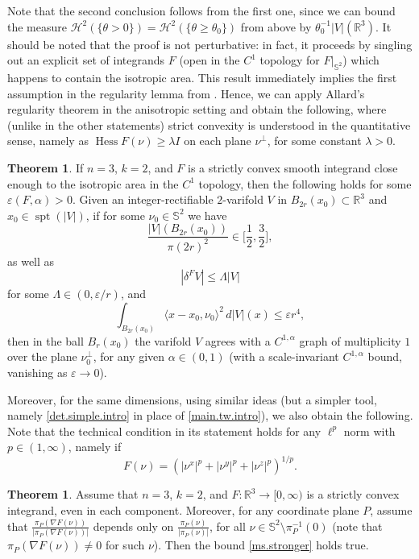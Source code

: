 \documentclass[11pt,a4paper]{amsart}
\newcommand{\R}{\mathbb{R}}
\newcommand{\ang}[1]{\langle#1\rangle}
\theoremstyle{definition}
\newtheorem{thm}[definition]{Theorem}
\renewcommand{\epsilon}{\varepsilon}
\begin{document}
Note that the second conclusion follows from the first one, since we can bound the measure $\mathcal{H}^2(\{\theta>0\})=\mathcal{H}^2(\{\theta\ge\theta_0\})$ from above by $\theta_0^{-1}|V|(\R^3)$.
It should be noted that the proof is not perturbative: in fact, it proceeds by
singling out an explicit set of integrands $F$ (open in the $C^1$ topology for $F|_{\mathbb{S}^{2}}$)
which happens to contain the isotropic area. %
This result %
immediately implies the first assumption in the regularity lemma from \cite[p.\ 25]{All.const}.
Hence, we can apply Allard's regularity theorem in the anisotropic setting \cite[p.\ 27]{All.const}
and obtain the following, where (unlike in the other statements) strict convexity is understood in the quantitative sense, namely as
$\operatorname{Hess}F(\nu)\ge\lambda I$ on each plane $\nu^\perp$, for some constant $\lambda>0$.

\begin{thm}
    If $n=3$, $k=2$, and $F$ is a strictly convex smooth integrand close enough to the isotropic area in the $C^1$ topology,
    then the following holds for some $\epsilon(F,\alpha)>0$. Given an integer-rectifiable $2$-varifold $V$ in $B_{2r}(x_0)\subset\R^3$ %
    and $x_0\in\operatorname{spt}(|V|)$,
    if for some $\nu_0\in\mathbb{S}^2$ we have
    $$\frac{|V|(B_{2r}(x_0))}{\pi(2r)^2}\in\Big[\frac12,\frac32\Big],$$
    as well as
    $$|\delta^FV|\le\Lambda|V|$$
    for some $\Lambda\in(0,\varepsilon/r)$, and
    $$\int_{B_{2r}(x_0)}\ang{x-x_0,\nu_0}^2\,d|V|(x)\le\epsilon r^4,$$
    then in the ball $B_r(x_0)$ the varifold $V$ agrees with a $C^{1,\alpha}$ graph of multiplicity $1$
    over the plane $\nu_0^\perp$,
    for any given $\alpha\in(0,1)$ (with a scale-invariant $C^{1,\alpha}$ bound, vanishing as $\epsilon\to0$).
\end{thm}

Moreover, for the same dimensions, using similar ideas (but a simpler tool, namely \cref{det.simple.intro}
in place of \cref{main.tw.intro}), we also obtain the following. Note that
the technical condition in its statement holds for any $\ell^p$ norm with $p\in(1,\infty)$,
namely if
$$F(\nu)=(|\nu^x|^p+|\nu^y|^p+|\nu^z|^p)^{1/p}.$$

\begin{thm}\label{main.tris}
    Assume that $n=3$, $k=2$, and $F:\R^3\to[0,\infty)$ is a strictly convex integrand, even in each component.
    Moreover, for any coordinate plane $P$, assume that
    $\frac{\pi_P(\nabla F(\nu))}{|\pi_P(\nabla F(\nu))|}$ depends only on $\frac{\pi_P(\nu)}{|\pi_P(\nu)|}$,
    for all $\nu\in\mathbb{S}^2\setminus\pi_P^{-1}(0)$ (note that
    $\pi_P(\nabla F(\nu))\neq0$ for such $\nu$).
    Then the bound \cref{ms.stronger} holds true.
\end{thm}
\end{document}
